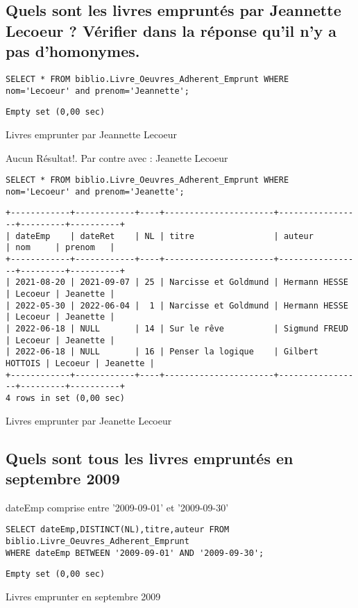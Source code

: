 \documentclass{article}
\begin{document}
\subsection{Quels sont les livres empruntés par Jeannette Lecoeur ? Vérifier dans
	la réponse qu'il n'y a pas d'homonymes.}
\begin{listing}[H]
	\begin{verbatim}
SELECT * FROM biblio.Livre_Oeuvres_Adherent_Emprunt WHERE nom='Lecoeur' and prenom='Jeannette';
\end{verbatim}
	\begin{verbatim}
Empty set (0,00 sec)
\end{verbatim}
	\caption{Livres emprunter par Jeannette Lecoeur}
\end{listing}
Aucun Résultat!.
\newpage
Par contre avec : Jeanette Lecoeur
\begin{listing}[H]
	\begin{verbatim}
SELECT * FROM biblio.Livre_Oeuvres_Adherent_Emprunt WHERE nom='Lecoeur' and prenom='Jeanette';
\end{verbatim}
	\begin{verbatim}
+------------+------------+----+----------------------+-----------------+---------+----------+
| dateEmp    | dateRet    | NL | titre                | auteur          | nom     | prenom   |
+------------+------------+----+----------------------+-----------------+---------+----------+
| 2021-08-20 | 2021-09-07 | 25 | Narcisse et Goldmund | Hermann HESSE   | Lecoeur | Jeanette |
| 2022-05-30 | 2022-06-04 |  1 | Narcisse et Goldmund | Hermann HESSE   | Lecoeur | Jeanette |
| 2022-06-18 | NULL       | 14 | Sur le rêve          | Sigmund FREUD   | Lecoeur | Jeanette |
| 2022-06-18 | NULL       | 16 | Penser la logique    | Gilbert HOTTOIS | Lecoeur | Jeanette |
+------------+------------+----+----------------------+-----------------+---------+----------+
4 rows in set (0,00 sec)
\end{verbatim}
	\caption{Livres emprunter par Jeanette Lecoeur}
\end{listing}

\subsection{Quels sont tous les livres empruntés en septembre 2009}
dateEmp comprise entre '2009-09-01' et '2009-09-30'
\begin{listing}[H]
	\begin{verbatim}
SELECT dateEmp,DISTINCT(NL),titre,auteur FROM biblio.Livre_Oeuvres_Adherent_Emprunt
WHERE dateEmp BETWEEN '2009-09-01' AND '2009-09-30';
\end{verbatim}
	\begin{verbatim}
Empty set (0,00 sec)
\end{verbatim}
	\caption{Livres emprunter en septembre 2009}
\end{listing}
\end{document}
